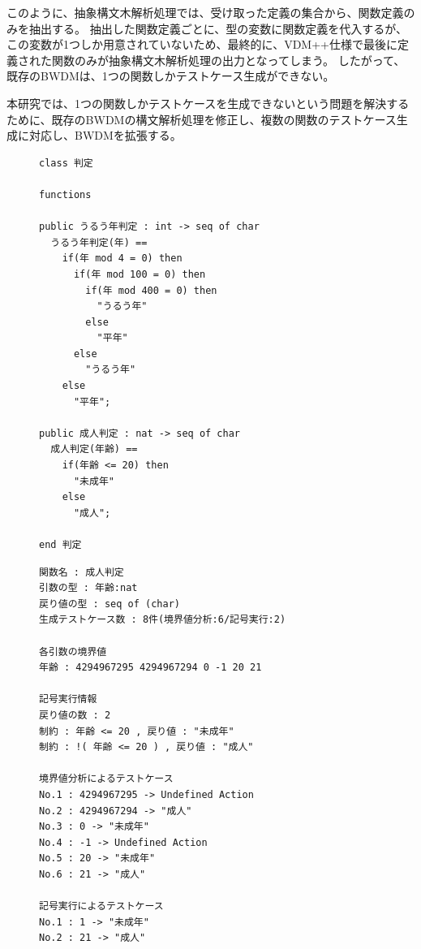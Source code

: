 \documentclass[uplatex, report, a4j, 10pt]{jsbook}
\newcommand{\tool}{BWDM}
\begin{document}
このように、抽象構文木解析処理では、受け取った定義の集合から、関数定義のみを抽出する。
抽出した関数定義ごとに、\TCExplicitFunctionDefinition{}型の変数に関数定義を代入するが、
この変数が1つしか用意されていないため、最終的に、VDM++仕様で最後に定義された関数のみが抽象構文木解析処理の出力となってしまう。
したがって、既存のBWDMは、1つの関数しかテストケース生成ができない。

本研究では、1つの関数しかテストケースを生成できないという問題を解決するために、既存の\tool{}の構文解析処理を修正し、複数の関数のテストケース生成に対応し、\tool{}を拡張する。

\lstset{language=}
\begin{figure}[tp]
  \begin{lstlisting}[caption=複数の関数を含むVDM++仕様,label=fig:func_multiple]
class 判定

functions

public うるう年判定 : int -> seq of char
  うるう年判定(年) ==
    if(年 mod 4 = 0) then
      if(年 mod 100 = 0) then
        if(年 mod 400 = 0) then
          "うるう年"
        else
          "平年"
      else
        "うるう年"
    else
      "平年";

public 成人判定 : nat -> seq of char
  成人判定(年齢) ==
    if(年齢 <= 20) then
      "未成年"
    else
      "成人";

end 判定
\end{lstlisting}
\end{figure}

\lstset{language=}
\begin{figure}[tp]
  \begin{lstlisting}[caption=コード\ref{fig:func_multiple}のVDM++仕様を既存のBWDMに適用した際の出力,label=fig:func_multiple_result]
関数名 : 成人判定
引数の型 : 年齢:nat 
戻り値の型 : seq of (char)
生成テストケース数 : 8件(境界値分析:6/記号実行:2)

各引数の境界値
年齢 : 4294967295 4294967294 0 -1 20 21 

記号実行情報
戻り値の数 : 2
制約 : 年齢 <= 20 , 戻り値 : "未成年"
制約 : !( 年齢 <= 20 ) , 戻り値 : "成人"

境界値分析によるテストケース
No.1 : 4294967295 -> Undefined Action
No.2 : 4294967294 -> "成人"
No.3 : 0 -> "未成年"
No.4 : -1 -> Undefined Action
No.5 : 20 -> "未成年"
No.6 : 21 -> "成人"

記号実行によるテストケース
No.1 : 1 -> "未成年"
No.2 : 21 -> "成人"
\end{lstlisting}
\end{figure}
\end{document}
